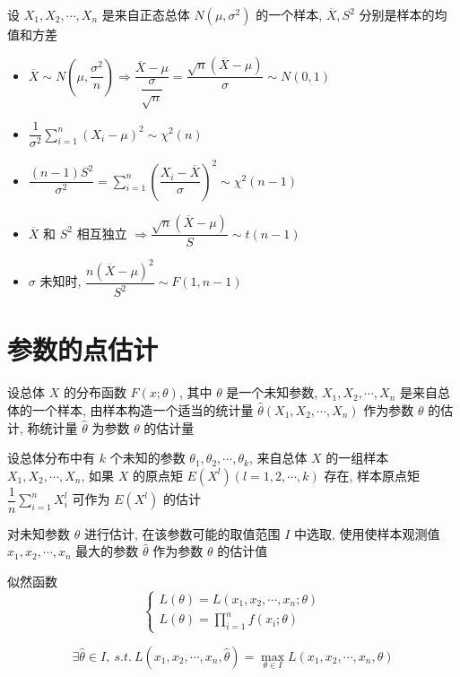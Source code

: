 \begin{corollary}[正态总体推论]
	
	设 $X_{1}, X_{2}, \cdots, X_{n}$ 是来自正态总体 $N(\mu,\sigma^{2})$ 的一个样本, $\overline{X}, S^2$ 分别是样本的均值和方差
	\begin{itemize}
		\item $\overline{X}\sim N(\mu,\dfrac{\sigma^2}{n})\Rightarrow \dfrac{\overline{X}-\mu}{\dfrac{\sigma}{\sqrt{n}}}=\dfrac{\sqrt{n}(\overline{X}-\mu)}{\sigma}\sim N(0,1)$
		\item $\dfrac{1}{\sigma^{2}}\sum\limits_{i=1}^{n}(X_{i}-\mu)^{2}\sim \chi^{2}(n)$
		\item $\dfrac{(n-1)S^2}{\sigma^2}=\sum\limits_{i=1}^{n}(\dfrac{X_{i}-\overline{X}}{\sigma})^2\sim \chi^2(n-1)$
		\item $\overline{X}$ 和 $S^{2}$ 相互独立 $\Rightarrow \dfrac{\sqrt{n}(\overline{X}-\mu)}{S}\sim t(n-1)$
		\item $\sigma$ 未知时, $\dfrac{n(\overline{X}-\mu)^2}{S^2}\sim F(1,n-1)$
	\end{itemize}
\end{corollary}


\section{参数的点估计}
\begin{definition}[参数点估计]
	设总体 $X$ 的分布函数 $F(x;\theta)$, 其中 $\theta$ 是一个未知参数, $X_{1},X_{2},\cdots,X_{n}$ 是来自总体的一个样本,
	由样本构造一个适当的统计量 $\hat{\theta}(X_{1},X_{2},\cdots,X_{n})$ 作为参数 $\theta$ 的估计, 称统计量 $\hat{\theta}$ 为参数 $\theta$ 的估计量
\end{definition}

\begin{definition}[矩估计]
	设总体分布中有 $k$ 个未知的参数 $\theta_{1},\theta_{2},\cdots,\theta_{k}$, 来自总体 $X$ 的一组样本 $X_{1},X_{2},\cdots,X_{n}$, 
	如果 $X$ 的原点矩 $E(X^{l})(l = 1, 2, \cdots, k)$ 存在, 样本原点矩 $\dfrac{1}{n}\sum\limits_{i=1}^{n}X_{i}^{l}$ 可作为 $E(X^{l})$ 的估计
\end{definition}

\begin{definition}[最大似然估计]
	对未知参数 $\theta$ 进行估计, 在该参数可能的取值范围 $I$ 中选取, 使用使样本观测值 $x_{1},x_{2},\cdots,x_{n}$ 最大的参数 $\hat{\theta}$ 作为参数 $\theta$ 的估计值
	
	似然函数 
	$$\begin{cases}
		L(\theta) = L(x_{1},x_{2},\cdots,x_{n};\theta)\\
		L(\theta) = \prod\limits_{i=1}^{n}f(x_{i};\theta)
	\end{cases}$$
	
	$$\exists \hat{\theta}\in I,\ s.t.\ L(x_{1},x_{2},\cdots,x_{n},\hat{\theta}) = \max_{\theta\in I}L(x_{1},x_{2},\cdots,x_{n},\theta)$$
\end{definition}

